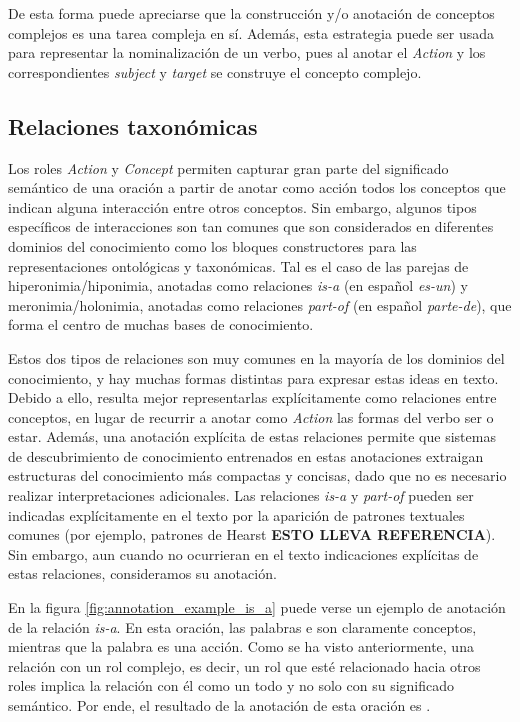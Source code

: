 De esta forma puede apreciarse que la construcción y/o anotación de conceptos complejos es una tarea compleja en sí. Además, esta estrategia puede ser usada para representar la nominalización de un verbo, pues al anotar el \textit{Action} y los correspondientes \textit{subject} y \textit{target} se
construye el concepto complejo.

\subsection{Relaciones taxonómicas}
Los roles \textit{Action} y \textit{Concept} permiten capturar gran parte del significado semántico de una oración a partir de anotar como acción todos los conceptos que indican alguna interacción entre otros conceptos. Sin embargo, algunos tipos específicos de interacciones son tan comunes que son considerados en diferentes dominios del conocimiento como los bloques constructores para las representaciones ontológicas y taxonómicas. Tal es el caso de las parejas de hiperonimia/hiponimia, anotadas como relaciones \textit{is-a} (en español \textit{es-un}) y meronimia/holonimia, anotadas como relaciones \textit{part-of} (en español \textit{parte-de}), que forma el centro de muchas bases de conocimiento.

Estos dos tipos de relaciones son muy comunes en la mayoría de los dominios del conocimiento, y hay muchas formas distintas para expresar
estas ideas en texto. Debido a ello, resulta mejor representarlas explícitamente como relaciones entre conceptos, en lugar de recurrir a anotar como \textit{Action} las formas del verbo ser o estar. Además, una anotación explícita de estas relaciones permite que sistemas de descubrimiento de conocimiento entrenados en estas anotaciones extraigan estructuras del conocimiento más compactas y concisas, dado que no es necesario realizar interpretaciones adicionales. Las relaciones \textit{is-a} y \textit{part-of} pueden ser indicadas explícitamente en el texto por la aparición de patrones textuales comunes (por ejemplo, patrones de Hearst \textbf{ESTO LLEVA REFERENCIA}). Sin embargo, aun cuando no ocurrieran en el texto indicaciones explícitas de estas relaciones, consideramos su anotación.

En la figura \ref{fig:annotation_example_is_a} puede verse un ejemplo de anotación de la relación \textit{is-a}. En esta oración, las palabras  e  son claramente conceptos, mientras que la palabra  es una acción. Como se ha visto anteriormente, una relación con un rol complejo, es decir, un rol que esté relacionado hacia otros roles implica la relación con él como un todo y no solo con su significado semántico. Por ende, el resultado de la anotación de esta oración es .

